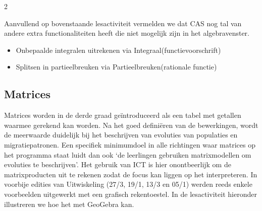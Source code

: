 \begin{multicols}{2}

Aanvullend op bovenstaande lesactiviteit vermelden we dat CAS nog tal van andere extra functionaliteiten heeft die niet mogelijk zijn in het algebravenster. 
\begin{itemize}
    \item Onbepaalde integralen uitrekenen via Integraal(functievoorschrift) 
    \item Splitsen in partieelbreuken via Partieelbreuken(rationale functie)
\end{itemize}


\subsection{Matrices}
Matrices worden in de derde graad ge\"introduceerd als een tabel met getallen waarmee gerekend kan worden. Na het goed defini\"eren van de bewerkingen, wordt de meerwaarde duidelijk bij het beschrijven van evoluties van populaties en migratiepatronen. Een specifiek minimumdoel in alle richtingen waar matrices op het programma staat luidt dan ook `de leerlingen gebruiken matrixmodellen om evoluties te beschrijven'. Het gebruik van ICT is hier onontbeerlijk om de matrixproducten uit te rekenen zodat de focus kan liggen op het interpreteren. In voorbije edities van Uitwiskeling (27/3, 19/1, 13/3 en 05/1) werden reeds enkele voorbeelden uitgewerkt met een grafisch rekentoestel. In de lesactiviteit hieronder illustreren we hoe het met GeoGebra kan.  

 \end{multicols}

